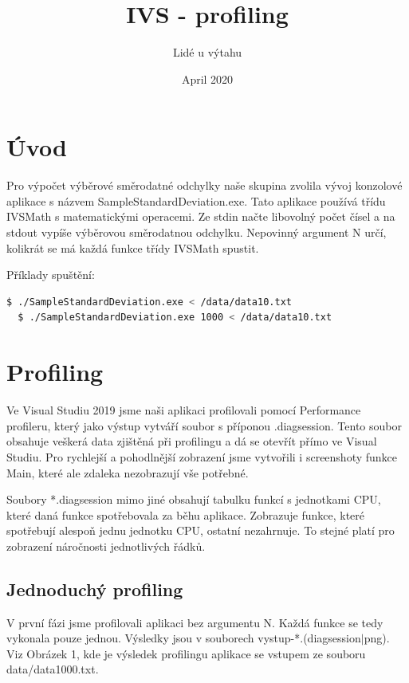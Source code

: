\documentclass{article}
\title{IVS - profiling}
\author{Lidé u výtahu}
\date{April 2020}
\begin{document}
\maketitle

\tableofcontents

\section{Úvod}
Pro výpočet výběrové směrodatné odchylky naše skupina zvolila vývoj konzolové aplikace s názvem SampleStandardDeviation.exe. Tato aplikace používá třídu IVSMath s matematickými operacemi. Ze stdin načte libovolný počet čísel a na stdout vypíše výběrovou směrodatnou odchylku. Nepovinný argument N určí, kolikrát se má každá funkce třídy IVSMath spustit.

Příklady spuštění:

\begin{lstlisting}[language=bash]
  $ ./SampleStandardDeviation.exe < /data/data10.txt
  $ ./SampleStandardDeviation.exe 1000 < /data/data10.txt
\end{lstlisting}

\section{Profiling}
Ve Visual Studiu 2019 jsme naši aplikaci profilovali pomocí Performance profileru, který jako výstup vytváří soubor s příponou .diagsession. Tento soubor obsahuje veškerá data zjištěná při profilingu a dá se otevřít přímo ve Visual Studiu. Pro rychlejší a pohodlnější zobrazení jsme vytvořili i screenshoty funkce Main, které ale zdaleka nezobrazují vše potřebné. 

Soubory *.diagsession mimo jiné obsahují tabulku funkcí s jednotkami CPU, které daná funkce spotřebovala za běhu aplikace. Zobrazuje funkce, které spotřebují alespoň jednu jednotku CPU, ostatní nezahrnuje. To stejné platí pro zobrazení náročnosti jednotlivých řádků. 

\subsection{Jednoduchý profiling}
V první fázi jsme profilovali aplikaci bez argumentu N. Každá funkce se tedy vykonala pouze jednou. Výsledky jsou v souborech vystup-*.(diagsession$|$png). Viz Obrázek 1, kde je výsledek profilingu aplikace se vstupem ze souboru data/data1000.txt.
\end{document}
